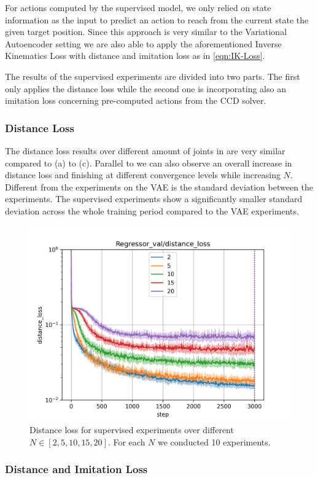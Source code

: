 For actions computed by the supervised model, we only relied on state information as the input to predict an action to reach from the current state the given target position.  Since this approach is very similar to the Variational Autoencoder setting we are also able to apply the aforementioned Inverse Kinematics Loss with distance and imitation loss as in \eqref{eqn:IK-Loss}.

The results of the supervised experiments are divided into two parts. The first only applies the distance loss while the second one is incorporating also an imitation loss concerning pre-computed actions from the CCD solver.

\subsubsection{Distance Loss}

The distance loss results over different amount of joints in  are very similar compared to  (a) to (c). Parallel to  we can also observe an overall increase in distance loss and finishing at different convergence levels while increasing $N$. Different from the experiments on the VAE is the standard deviation between the experiments. The supervised experiments show a significantly smaller standard deviation across the whole training period compared to the VAE experiments.

\begin{figure}[h]
    \begin{center}
        \includegraphics[width=0.46 \linewidth]{figures/experiments/supervised_2_distance_loss.png}
    \end{center}
    \caption[Supervised Distance Loss]{Distance loss for supervised experiments over different $N \in [2, 5, 10, 15, 20]$. For each $N$ we conducted 10 experiments. }
    \label{fig:supervised_distance}
\end{figure}

\subsubsection{Distance and Imitation Loss}

